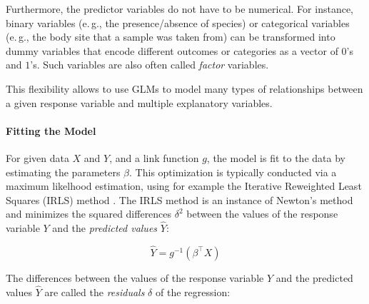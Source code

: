 Furthermore, the predictor variables do not have to be numerical.
For instance, binary variables (e.\,g., the presence/absence of species)
or categorical variables (e.\,g., the body site that a sample was taken from) can be transformed into dummy variables
that encode different outcomes or categories as a vector of $0$'s and $1$'s.
Such variables are also often called \emph{factor} variables.

This flexibility allows to use \acp{GLM} to model many types of relationships
between a given response variable and multiple explanatory variables.


\paragraph{Fitting the Model}
\label{sec:Factorization:sub:Methods:sub:GLMs:par:Fitting}

For given data $X$ and $Y$, and a link function $g$, the model is fit to the data by estimating the parameters $\beta$.
This optimization is typically conducted via a maximum likelhood estimation,
using for example the Iterative Reweighted Least Squares (IRLS) method \cite{Burrus2012}.
The IRLS method is an instance of Newton's method \cite{Ypma1995}
and minimizes the squared differences $\delta^2$ between the values of the response variable $Y$
and the \emph{predicted values} $\hat{Y}$:


\begin{equation}
    \label{sec:Factorization:sub:GLM:eq:predicted}
    \hat{Y} = g^{-1}(\beta^\intercal X)
\end{equation}

The differences between the values of the response variable $Y$ and the predicted values $\hat{Y}$
are called the \emph{residuals} $\delta$ of the regression:


